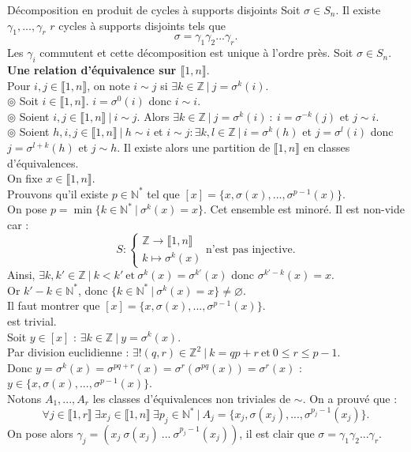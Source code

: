 \documentclass[11pt]{article}
\newcommand*{\Z}{\mathbb{Z}}
\newcommand*{\N}{\mathbb{N}}
\newcommand*{\lb}{\llbracket}
\newcommand*{\rb}{\rrbracket}
\newcommand*{\n}{\\[0.2cm]}
\newcommand{\0}{\varnothing}
\newcommand*{\g}{\gamma}
\newcommand*{\s}{\sigma}
\begin{document}
\begin{thm}{Décomposition en produit de cycles à supports disjoints}{}
    Soit $\s\in S_n$. Il existe $\g_1,...,\g_r$ $r$ cycles à supports disjoints tels que
    \begin{equation*}
        \s=\g_1\g_2...\g_r.
    \end{equation*}
    Les $\g_i$ commutent et cette décomposition est unique à l'ordre près.
    \tcblower
    Soit $\s\in S_n$.\\
    \textbf{Une relation d'équivalence sur $\lb1,n\rb$}.\\
    Pour $i,j\in\lb1,n\rb$, on note $i\sim j$ si $\exists k \in \Z ~ | ~ j = \s^k(i)$.\\
    $\circledcirc$ Soit $i\in\lb1,n\rb$. $i=\s^0(i)$ donc $i \sim i$.\\
    $\circledcirc$ Soient $i,j\in\lb1,n\rb ~ | ~ i \sim j$. Alors $\exists k \in \Z ~ | ~ j = \s^k(i) ~ : ~ i = \s^{-k}(j)$ et $j \sim i$.\\
    $\circledcirc$ Soient $h,i,j\in\lb1,n\rb ~ | ~ h \sim i$ et $i \sim j : \exists k,l \in \Z ~ | ~ i = \s^k(h)$ et $j=\s^l(i)$ donc $j=\s^{l+k}(h)$ et $j \sim h$.
    Il existe alors une partition de $\lb1,n\rb$ en classes d'équivalences.\n
    On fixe $x\in\lb1,n\rb$.\\
    Prouvons qu'il existe $p\in\N^*$ tel que $[x]=\{x,\s(x),...,\s^{p-1}(x)\}$.\\
    On pose $p=\min\{k\in\N^* ~ | ~ \s^k(x)=x\}$. Cet ensemble est minoré. Il est non-vide car :
    \begin{equation*}
        S : \begin{cases}
            \Z \to \lb1,n\rb\\
            k\mapsto \s^k(x)
        \end{cases}
        \text{n'est pas injective.}
    \end{equation*}
    Ainsi, $\exists k,k' \in \Z ~ | ~ k < k' ~ \text{et} ~ \s^k(x)=\s^{k'}(x)$ donc $\s^{k'-k}(x)=x$.\\
    Or $k'-k\in\N^*$, donc $\{k\in\N^* ~ | ~ \s^k(x)=x\}\neq\0$.\\
    Il faut montrer que $[x]=\{x,\s(x),...,\s^{p-1}(x)\}$.\\
    \fbox{$\supset$} est trivial.\\
    \fbox{$\subset$} Soit $y\in[x]$ : $\exists k \in \Z ~ | ~ y = \s^k(x)$.\\
    Par division euclidienne : $\exists!(q,r)\in\Z^2 ~ | ~ k = qp + r ~ \text{et} ~ 0 \leq r \leq p-1$.\\
    Donc $y = \s^k(x) = \s^{pq+r}(x) = \s^r(\s^{pq}(x))=\s^r(x)$ : $y\in\{x,\s(x),...,\s^{p-1}(x)\}$.\n
    Notons $A_1,...,A_r$ les classes d'équivalences non triviales de $\sim$. On a prouvé que :
    \begin{equation*}
        \forall j \in \lb1,r\rb ~ \exists x_j \in \lb 1, n \rb ~ \exists p_j \in \N^* ~ | ~ A_j = \{x_j, \s(x_j), ..., \s^{p_j-1}(x_j)\}.
    \end{equation*}
    On pose alors $\g_j=(x_j~\s(x_j)~...~\s^{p_j-1}(x_j))$, il est clair que $\s=\g_1\g_2...\g_r$.
\end{thm}
\end{document}
